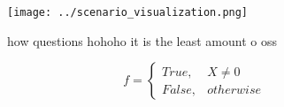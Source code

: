 \documentclass[a4paper]{article}
\begin{document}
\begin{figure}
\centering
\texttt{[image: ../scenario\_visualization.png]}
\caption{how questions hohoho it is the least amount o oss
}
\end{figure}
 
\begin{equation}   f =
\begin{cases} True, & X \neq 0\\
False, & otherwise
\end{cases}
\end{equation}
\end{document}
